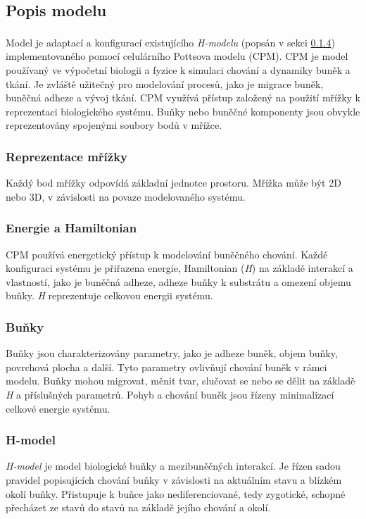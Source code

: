 \documentclass[10pt,a4paper,twocolumn]{article}
\begin{document}
\subsection{Popis modelu}
\label{subsec:model_setup}
Model je adaptací a konfigurací existujícího \textit{H-modelu}\textsuperscript{\cite{h-model}} (popsán v sekci \ref{subsubsec:H-model}) implementovaného pomocí celulárního Pottsova modelu (CPM). CPM je model používaný ve výpočetní biologii a fyzice k simulaci chování a dynamiky buněk a tkání. Je zvláště užitečný pro modelování procesů, jako je migrace buněk, buněčná adheze a vývoj tkání. CPM využívá přístup založený na použití mřížky k reprezentaci biologického systému. Buňky nebo buněčné komponenty jsou obvykle reprezentovány spojenými soubory bodů v mřížce.

\subsubsection{Reprezentace mřížky} Každý bod mřížky odpovídá základní jednotce prostoru. Mřížka může být 2D nebo 3D, v závislosti na povaze modelovaného systému.

\subsubsection{Energie a Hamiltonian} CPM používá energetický přístup k modelování buněčného chování. Každé konfiguraci systému je přiřazena energie, Hamiltonian (\textit{H}) na základě interakcí a vlastností, jako je buněčná adheze, adheze buňky k substrátu a omezení objemu buňky. \textit{H} reprezentuje celkovou energii systému.

\subsubsection{Buňky} Buňky jsou charakterizovány parametry, jako je adheze buněk, objem buňky, povrchová plocha a další. Tyto parametry ovlivňují chování buněk v rámci modelu. Buňky mohou migrovat, měnit tvar, slučovat se nebo se dělit na základě \textit{H} a příslušných parametrů. Pohyb a chování buněk jsou řízeny minimalizací celkové energie systému.

\subsubsection{H-model}
\label{subsubsec:H-model}
\textit{H-model} je model biologické buňky a mezibuněčných interakcí. Je řízen sadou pravidel popisujících chování buňky v závislosti na aktuálním stavu a blízkém okolí buňky. Přistupuje k buňce jako nediferenciované, tedy zygotické, schopné přecházet ze stavů do stavů na základě jejího chování a okolí.
\end{document}

